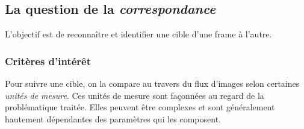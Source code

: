 \documentclass[a4paper,12pt]{report}
\begin{document}
	

\subsection{La question de la \textit{correspondance}}

L'objectif est de reconnaître et identifier une cible d'une frame à l'autre. \\

\subsubsection{Critères d'intérêt}
Pour suivre une cible, on la compare au travers du flux d'images selon certaines \textit{unités de mesure}.
Ces unités de mesure sont façonnées au regard de la problématique traitée. Elles peuvent \^etre complexes et sont généralement hautement dépendantes des paramètres qui les composent.
\end{document}
